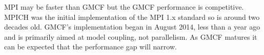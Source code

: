 MPI may be faster than GMCF but the GMCF performance is competitive. MPICH was
the initial implementation of the MPI 1.x standard so is around two decades old.
GMCF's implementation began in August 2014, less than a year ago and is
primarily aimed at model coupling, not parallelism. As GMCF matures it can be
expected that the performance gap will narrow.
